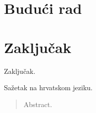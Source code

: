 \documentclass[times, utf8, diplomski, numeric]{fer}
\begin{document}
\chapter{Budući rad}

\chapter{Zaključak}
Zaključak.




\begin{sazetak}
Sažetak na hrvatskom jeziku.

\end{sazetak}

\begin{abstract}
Abstract.

\end{abstract}
\end{document}
